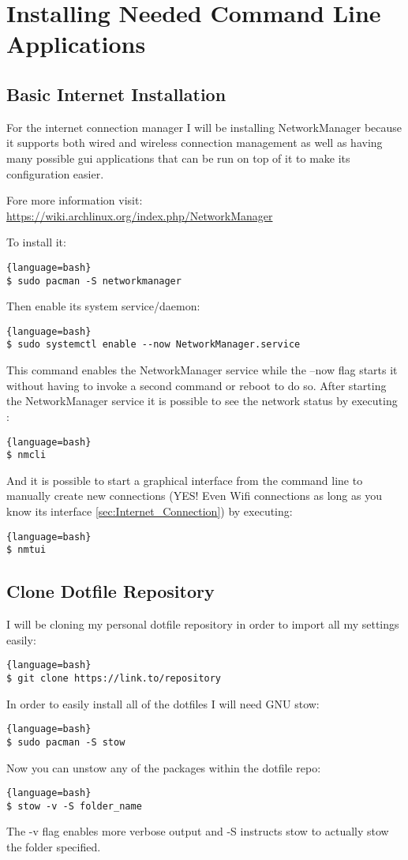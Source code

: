 \section{Installing Needed Command Line Applications}
\subsection{Basic Internet Installation}
For the internet connection manager I will be installing NetworkManager because it supports both wired and wireless connection management as well as having many possible gui applications that can be run on top of it to make its configuration easier.

Fore more information visit: \url{https://wiki.archlinux.org/index.php/NetworkManager}

To install it:
\begin{lstlisting}{language=bash}
$ sudo pacman -S networkmanager
\end{lstlisting}
Then enable its system service/daemon:
\begin{lstlisting}{language=bash}
$ sudo systemctl enable --now NetworkManager.service
\end{lstlisting}
This command enables the NetworkManager service while the --now flag starts it without having to invoke a second command or reboot to do so.
After starting the NetworkManager service it is possible to see the network status by executing :
\begin{lstlisting}{language=bash}
$ nmcli
\end{lstlisting}
And it is possible to start a graphical interface from the command line to manually create new connections (YES! Even Wifi connections as long as you know its interface \ref{sec:Internet_Connection}) by executing:
\begin{lstlisting}{language=bash}
$ nmtui
\end{lstlisting}

\subsection{Clone Dotfile Repository}
I will be cloning my personal dotfile repository in order to import all my settings easily:
\begin{lstlisting}{language=bash}
$ git clone https://link.to/repository
\end{lstlisting}
In order to easily install all of the dotfiles I will need GNU stow:
\begin{lstlisting}{language=bash}
$ sudo pacman -S stow
\end{lstlisting}
Now you can unstow any of the packages within the dotfile repo:
\begin{lstlisting}{language=bash}
$ stow -v -S folder_name
\end{lstlisting}
The -v flag enables more verbose output and -S instructs stow to actually stow the folder specified.


